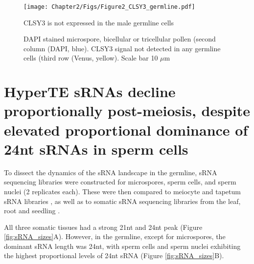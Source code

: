 \begin{figure}[htbp!] 
\centering    
    \texttt{[image: Chapter2/Figs/Figure2\_CLSY3\_germline.pdf]}
\caption{CLSY3 is not expressed in the male germline cells}
\label{fig:CLSY3_germ}
\captionsetup{font=small}
    \caption*{DAPI stained microspore, bicellular or tricellular pollen (second column (DAPI, blue). CLSY3 signal not detected in any germline cells (third row (Venus, yellow). Scale bar 10 $\mu$m}
\end{figure}


\section{HyperTE sRNAs decline proportionally post-meiosis, despite elevated proportional dominance of 24nt sRNAs in sperm cells}

To dissect the dynamics of the sRNA landscape in the germline, sRNA sequencing libraries were constructed for microspores, sperm cells, and sperm nuclei (2 replicates each). These were then compared to meiocyte and tapetum sRNA libraries \cite{RN187}, as well as to somatic sRNA sequencing libraries from the leaf, root and seedling \cite{RN262,RN263,RN264}. 

All three somatic tissues had a strong 21nt and 24nt peak (Figure \ref{fig:sRNA_sizes}A). However, in the germline, except for microspores, the dominant sRNA length was 24nt, with sperm cells and sperm nuclei exhibiting the highest proportional levels of 24nt sRNA (Figure \ref{fig:sRNA_sizes}B).

